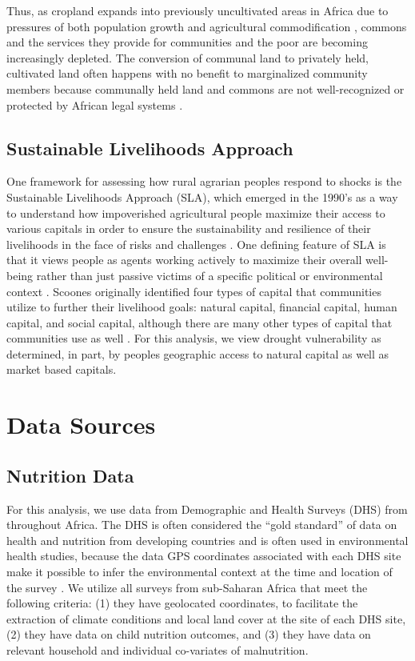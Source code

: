 \documentclass{article}
\begin{document}
Thus, as cropland expands into previously uncultivated areas in Africa due to pressures of both population growth and agricultural commodification \cite{Rudel2013, Laurance2014}, commons and the services they provide for communities and the poor are becoming increasingly depleted.  The conversion of communal land to privately held, cultivated land often happens with no benefit to marginalized community members because communally held land and commons are not well-recognized or protected by African legal systems \cite{Wily2011}.

\subsection{Sustainable Livelihoods Approach}
One framework for assessing how rural agrarian peoples respond to shocks is the Sustainable Livelihoods Approach (SLA), which emerged in the 1990’s as a way to understand how impoverished agricultural people maximize their access to various capitals in order to ensure the sustainability and resilience of their livelihoods in the face of risks and challenges \cite{Scoones1998a, Ellis1998, Bebbington1999}.  One defining feature of SLA is that it views people as agents working actively to maximize their overall well-being rather than just passive victims of a specific political or environmental context \cite{Adato2002}.  Scoones originally identified four types of capital that communities utilize to further their livelihood goals: natural capital, financial capital, human capital, and social capital, although there are many other types of capital that communities use as well \cite{Scoones1998a}.  For this analysis, we view drought vulnerability as determined, in part, by peoples geographic access to natural capital as well as market based capitals.

\section{Data Sources}

\subsection{Nutrition Data}

For this analysis, we use data from Demographic and Health Surveys (DHS) from throughout Africa.  The DHS is often considered the ``gold standard'' of data on health and nutrition from developing countries and is often used in environmental health studies, because the data GPS coordinates associated with each DHS site make it possible to infer the environmental context at the time and location of the survey \cite{Brown2014}.  We utilize all surveys from sub-Saharan Africa that meet the following criteria: (1) they have geolocated coordinates, to facilitate the extraction of climate conditions and local land cover at the site of each DHS site, (2) they have data on child nutrition outcomes, and (3) they have data on relevant household and individual co-variates of malnutrition.
\end{document}
